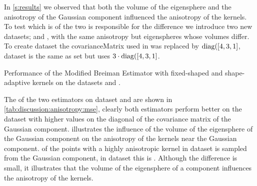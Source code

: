 	In \cref{s:results} we observed that both the volume of the eigensphere and the anisotropy of the Gaussian component influenced the anisotropy of the kernels. To test which is of the two is responsible for the difference we introduce two new datasets; \anisotropyOne and \anisotropyTwo, with the same anisotropy but eigenspheres whose volumes differ. To create dataset \anisotropyOne the covarianceMatrix used in \ferdosiOne was replaced by $\operatorname{diag}([4, 3, 1]$, dataset \anisotropyTwo is the same as set \anisotropyOne but uses $3 \cdot \operatorname{diag}([4, 3, 1]$.
	\begin{table}
		\centering
		
		\caption{Performance of the Modified Breiman Estimator with fixed-shaped and shape-adaptive kernels on the datasets \anisotropyOne and \anisotropyTwo.} 	
		\label{tab:discussion:anisotropy:mse}
	\end{table}
	The \mses of the two estimators on dataset \anisotropyOne and \anisotropyTwo are shown in \cref{tab:discussion:anisotropy:mse}, clearly both estimators perform better on the dataset with higher values on the diagonal of the covariance matrix of the Gaussian component.
	 illustrates the influence of the volume of the eigensphere of the Gaussian component on the anisotropy of the kernels near the Gaussian component.  of the points with a highly anisotropic kernel in dataset \anisotropyOne is sampled from the Gaussian component, in dataset \anisotropyTwo this is . Although the difference is small, it illustrates that the volume of the eigensphere of a component influences the anisotropy of the kernels. 

